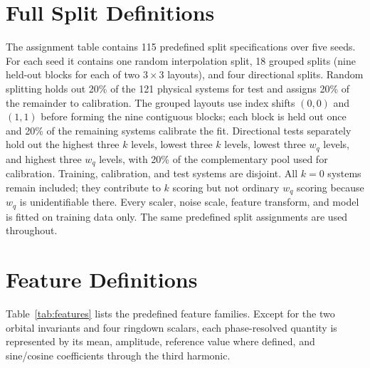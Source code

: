 \documentclass[11pt]{article}
\newcommand{\wq}{w_q}
\begin{document}
\section{Full Split Definitions}
The assignment table contains 115 predefined split specifications
over five seeds. For each seed it contains one random interpolation split, 18
grouped splits (nine held-out blocks for each of two $3\times3$ layouts), and
four directional splits. Random splitting holds out 20\% of the 121 physical
systems for test and assigns 20\% of the remainder to calibration. The grouped
layouts use index shifts $(0,0)$ and $(1,1)$ before forming the nine contiguous
blocks; each block is held out once and 20\% of the remaining systems calibrate
the fit. Directional tests separately hold out the highest three $k$ levels,
lowest three $k$ levels, lowest three $\wq$ levels, and highest three $\wq$
levels, with 20\% of the complementary pool used for calibration. Training,
calibration, and test systems are disjoint. All $k=0$ systems remain included;
they contribute to $k$ scoring but not ordinary $\wq$ scoring because $\wq$ is
unidentifiable there. Every scaler, noise scale, feature transform, and model
is fitted on training data only. The same predefined split assignments are used
throughout.

\section{Feature Definitions}
\label{app:features}
Table~\ref{tab:features} lists the predefined feature families. Except for the
two orbital invariants and four ringdown scalars, each phase-resolved quantity
is represented by its mean, amplitude, reference value where defined, and
sine/cosine coefficients through the third harmonic.
\end{document}

